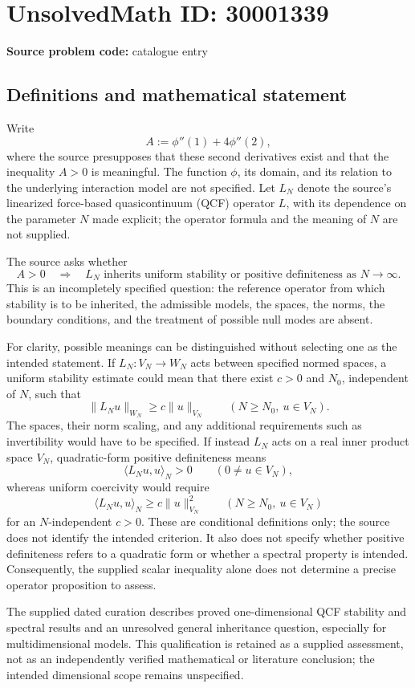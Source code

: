 \documentclass[11pt]{article}
\begin{document}
\section*{UnsolvedMath ID: 30001339}
\textbf{Source problem code:} catalogue entry
\subsection{Definitions and mathematical statement}
Write
\[
A:=\phi''(1)+4\phi''(2),
\]
where the source presupposes that these second derivatives exist and that the inequality \(A>0\) is meaningful. The function \(\phi\), its domain, and its relation to the underlying interaction model are not specified. Let \(L_N\) denote the source's linearized force-based quasicontinuum (QCF) operator \(L\), with its dependence on the parameter \(N\) made explicit; the operator formula and the meaning of \(N\) are not supplied.

The source asks whether
\[
A>0
\quad\Longrightarrow\quad
\text{\(L_N\) inherits uniform stability or positive definiteness as \(N\to\infty\).}
\]
This is an incompletely specified question: the reference operator from which stability is to be inherited, the admissible models, the spaces, the norms, the boundary conditions, and the treatment of possible null modes are absent.

For clarity, possible meanings can be distinguished without selecting one as the intended statement. If \(L_N:V_N\to W_N\) acts between specified normed spaces, a uniform stability estimate could mean that there exist \(c>0\) and \(N_0\), independent of \(N\), such that
\[
\|L_Nu\|_{W_N}\ge c\|u\|_{V_N}
\qquad(N\ge N_0,\ u\in V_N).
\]
The spaces, their norm scaling, and any additional requirements such as invertibility would have to be specified. If instead \(L_N\) acts on a real inner product space \(V_N\), quadratic-form positive definiteness means
\[
\langle L_Nu,u\rangle_N>0
\qquad(0\ne u\in V_N),
\]
whereas uniform coercivity would require
\[
\langle L_Nu,u\rangle_N\ge c\|u\|_{V_N}^{2}
\qquad(N\ge N_0,\ u\in V_N)
\]
for an \(N\)-independent \(c>0\). These are conditional definitions only; the source does not identify the intended criterion. It also does not specify whether positive definiteness refers to a quadratic form or whether a spectral property is intended. Consequently, the supplied scalar inequality alone does not determine a precise operator proposition to assess.

The supplied dated curation describes proved one-dimensional QCF stability and spectral results and an unresolved general inheritance question, especially for multidimensional models. This qualification is retained as a supplied assessment, not as an independently verified mathematical or literature conclusion; the intended dimensional scope remains unspecified.
\end{document}
